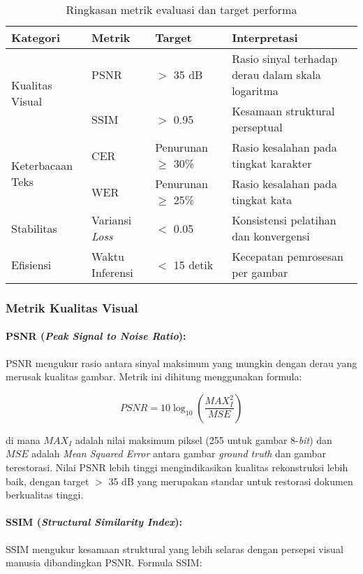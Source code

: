 \documentclass[12pt,a4paper]{article}
\begin{document}
\begin{table}[H]
\centering
\caption{Ringkasan metrik evaluasi dan target performa}
\label{tab:evaluation-metrics-summary}
\small
\begin{tabular}{|l|l|l|p{5cm}|}
\hline
\textbf{Kategori} & \textbf{Metrik} & \textbf{Target} & \textbf{Interpretasi} \\ \hline
\multirow{2}{*}{Kualitas Visual} & PSNR & $>$ 35 dB & Rasio sinyal terhadap derau dalam skala logaritma \\ \cline{2-4}
 & SSIM & $>$ 0.95 & Kesamaan struktural perseptual \\ \hline
\multirow{2}{*}{Keterbacaan Teks} & CER & Penurunan $\geq$ 30\% & Rasio kesalahan pada tingkat karakter \\ \cline{2-4}
 & WER & Penurunan $\geq$ 25\% & Rasio kesalahan pada tingkat kata \\ \hline
Stabilitas & Variansi \textit{Loss} & $<$ 0.05 & Konsistensi pelatihan dan konvergensi \\ \hline
Efisiensi & Waktu Inferensi & $<$ 15 detik & Kecepatan pemrosesan per gambar \\ \hline
\end{tabular}
\end{table}

\subsubsection{Metrik Kualitas Visual}
\paragraph{PSNR (\textit{Peak Signal to Noise Ratio}):}
PSNR mengukur rasio antara sinyal maksimum yang mungkin dengan derau yang merusak kualitas gambar. Metrik ini dihitung menggunakan formula:

\begin{equation}
PSNR = 10 \log_{10} \left( \frac{MAX_I^2}{MSE} \right)
\end{equation}

di mana $MAX_I$ adalah nilai maksimum piksel (255 untuk gambar 8-\textit{bit}) dan $MSE$ adalah \textit{Mean Squared Error} antara gambar \textit{ground truth} dan gambar terestorasi. Nilai PSNR lebih tinggi mengindikasikan kualitas rekonstruksi lebih baik, dengan target $>$ 35 dB yang merupakan standar untuk restorasi dokumen berkualitas tinggi.

\paragraph{SSIM (\textit{Structural Similarity Index}):}
SSIM mengukur kesamaan struktural yang lebih selaras dengan persepsi visual manusia dibandingkan PSNR. Formula SSIM:
\end{document}
